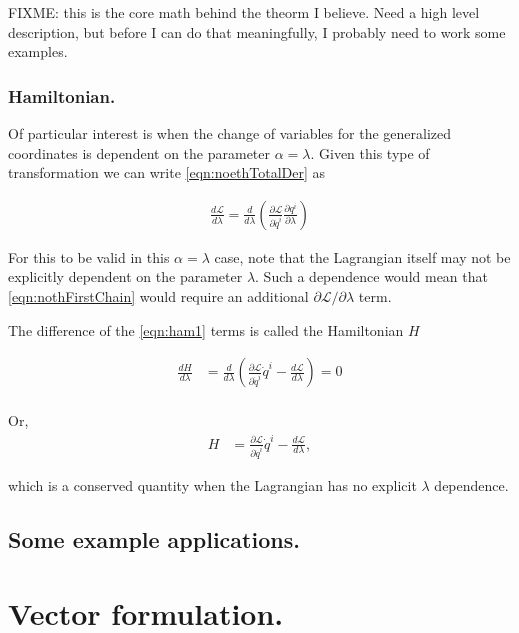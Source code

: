 \documentclass{article}
\newcommand{\LL}[0]{\mathcal{L}}
\newcommand{\qdot}[0]{\dot{q}}
\newcommand{\PD}[2]{\frac{\partial {#2}}{\partial {#1}}}
\newcommand{\PDi}[2]{{\partial {#2}}/{\partial {#1}}}
\begin{document}
FIXME: this is the core math behind the theorm I believe.  Need a high level description, but before I can do that meaningfully, I probably need to work
some examples.

\subsubsection{ Hamiltonian. }

Of particular interest is when the change of variables for the generalized coordinates is dependent on the parameter $\alpha = \lambda$.
Given this type of transformation we can write
\ref{eqn:noethTotalDer} as

\begin{align}\label{eqn:ham1}
\frac{d\LL}{d\lambda} = \frac{d}{d\lambda} \left( \PD{\qdot^i}{\LL} \PD{\lambda}{q^i} \right)
\end{align}

For this to be valid in this $\alpha = \lambda$ case, note that the Lagrangian
itself may not be explicitly dependent on the parameter $\lambda$.  Such a dependence would mean that \ref{eqn:nothFirstChain}
would require an additional $\PDi{\lambda}{\LL}$ term.

The difference of the \ref{eqn:ham1} terms is called the Hamiltonian $H$

\begin{align*}
\frac{dH}{d\lambda} &= \frac{d}{d\lambda} \left( \PD{\qdot^i}{\LL} \qdot^i - \frac{d\LL}{d\lambda} \right) = 0 \\
\end{align*}

Or,
\begin{align*}
H &= \PD{\qdot^i}{\LL} \qdot^i - \frac{d\LL}{d\lambda},
\end{align*}

which is a conserved quantity 
when the Lagrangian has no explicit $\lambda$ dependence.

\subsection{ Some example applications. }

\section{ Vector formulation. }
\end{document}
